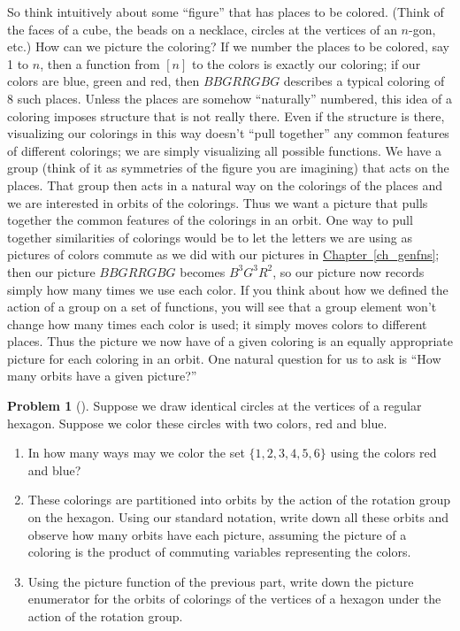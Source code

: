 \documentclass[10pt,]{book}
\theoremstyle{plain}
\theoremstyle{definition}
\newtheorem{activity}[project]{Problem}
\theoremstyle{definition}
\numberwithin{equation}{chapter}
\begin{document}
So think intuitively about some ``figure'' that has places to be colored. (Think of the faces of a cube, the beads on a necklace, circles at the vertices of an \(n\)-gon, etc.) How can we picture the coloring? If we number the places to be colored, say 1 to \(n\), then a function from \([n]\) to the colors is exactly our coloring; if our colors are blue, green and red, then \(BBGRRGBG\) describes a typical coloring of 8 such places. Unless the places are somehow ``naturally'' numbered, this idea of a coloring imposes structure that is not really there. Even if the structure is there, visualizing our colorings in this way doesn't ``pull together'' any common features of different colorings; we are simply visualizing all possible functions. We have a group (think of it as symmetries of the figure you are imagining) that acts on the places. That group then acts in a natural way on the colorings of the places and we are interested in orbits of the colorings. Thus we want a picture that pulls together the common features of the colorings in an orbit. One way to pull together similarities of colorings would be to let the letters we are using as pictures of colors commute as we did with our pictures in \hyperref[ch_genfns]{Chapter~\ref{ch_genfns}}; then our picture \(BBGRRGBG\) becomes \(B^3G^3R^2\), so our picture now records simply how many times we use each color. If you think about how we defined the action of a group on a set of functions, you will see that a group element won't change how many times each color is used; it simply moves colors to different places. Thus the picture we now have of a given coloring is an equally appropriate picture for each coloring in an orbit. One natural question for us to ask is ``How many orbits have a given picture?''%
\begin{activity}[]\marginsymbol[-1em]{} \label{coloredhex}
\hypertarget{p-1734}{}%
Suppose we draw identical circles at the vertices of a regular hexagon. Suppose we color these circles with two colors, red and blue.%
\begin{enumerate}[font=\bfseries,label=(\alph*),ref=\alph*]
\item\label{task-230} \marginsymbol[-2.5em]{} \hypertarget{p-1735}{}%
In how many ways may we color the set \(\{1, 2, 3, 4, 5, 6\}\) using the colors red and blue?%
\item\label{task-231} \marginsymbol[-2.5em]{} \hypertarget{p-1737}{}%
These colorings are partitioned into orbits by the action of the rotation group on the hexagon. Using our standard notation, write down all these orbits and observe how many orbits have each picture, assuming the picture of a coloring is the product of commuting variables representing the colors.%
\item\label{picture-enumerator-hexagon} \marginsymbol[-2.5em]{} \hypertarget{p-1740}{}%
Using the picture function of the previous part, write down the picture enumerator for the orbits of colorings of the vertices of a hexagon under the action of the rotation group.%
\end{enumerate}
\end{activity}
\end{document}
